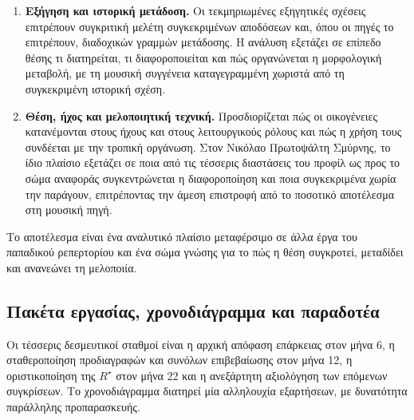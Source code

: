 \documentclass[11pt,a4paper]{article}
\begin{document}
\begin{enumerate}[label=\textbf{\arabic*.},leftmargin=2.2em]
\item \textbf{Εξήγηση και ιστορική μετάδοση.} Οι τεκμηριωμένες εξηγητικές σχέσεις επιτρέπουν συγκριτική μελέτη συγκεκριμένων αποδόσεων και, όπου οι πηγές το επιτρέπουν, διαδοχικών γραμμών μετάδοσης. Η ανάλυση εξετάζει σε επίπεδο θέσης τι διατηρείται, τι διαφοροποιείται και πώς οργανώνεται η μορφολογική μεταβολή, με τη μουσική συγγένεια καταγεγραμμένη χωριστά από τη συγκεκριμένη ιστορική σχέση.
\item \textbf{Θέση, ήχος και μελοποιητική τεχνική.} Προσδιορίζεται πώς οι οικογένειες κατανέμονται στους ήχους και στους λειτουργικούς ρόλους και πώς η χρήση τους συνδέεται με την τροπική οργάνωση. Στον Νικόλαο Πρωτοψάλτη Σμύρνης, το ίδιο πλαίσιο εξετάζει σε ποια από τις τέσσερις διαστάσεις του προφίλ ως προς το σώμα αναφοράς συγκεντρώνεται η διαφοροποίηση και ποια συγκεκριμένα χωρία την παράγουν, επιτρέποντας την άμεση επιστροφή από το ποσοτικό αποτέλεσμα στη μουσική πηγή.
\end{enumerate}
Το αποτέλεσμα είναι ένα αναλυτικό πλαίσιο μεταφέρσιμο σε άλλα έργα του παπαδικού ρεπερτορίου και ένα σώμα γνώσης για το πώς η θέση συγκροτεί, μεταδίδει και ανανεώνει τη μελοποιία.

\subsection{Πακέτα εργασίας, χρονοδιάγραμμα και παραδοτέα}

Οι τέσσερις δεσμευτικοί σταθμοί είναι η αρχική απόφαση επάρκειας στον μήνα 6, η σταθεροποίηση προδιαγραφών και συνόλων επιβεβαίωσης στον μήνα 12, η οριστικοποίηση της $R^\star$ στον μήνα 22 και η ανεξάρτητη αξιολόγηση των επόμενων συγκρίσεων. Το χρονοδιάγραμμα διατηρεί μία αλληλουχία εξαρτήσεων, με δυνατότητα παράλληλης προπαρασκευής.
\end{document}
